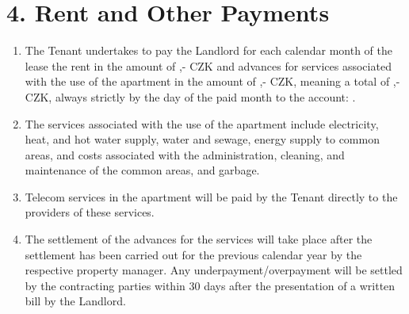 \section*{4. Rent and Other Payments}

\begin{enumerate}[label=\arabic*.]
    \item The Tenant undertakes to pay the Landlord for each calendar month of the lease the rent in the amount of \Rentrentamount,- CZK and advances for services associated with the use of the apartment in the amount of \Rentservicesamount,- CZK, meaning a total of \Renttotalamount,- CZK, always strictly by the \Rentpaymentday day of the paid month to the account: \Rentbankaccount.
    \item The services associated with the use of the apartment include electricity, heat, and hot water supply, water and sewage, energy supply to common areas, and costs associated with the administration, cleaning, and maintenance of the common areas, and garbage.
    \item Telecom services in the apartment will be paid by the Tenant directly to the providers of these services.
    \item The settlement of the advances for the services will take place after the settlement has been carried out for the previous calendar year by the respective property manager. Any underpayment/overpayment will be settled by the contracting parties within 30 days after the presentation of a written bill by the Landlord.
\end{enumerate}
